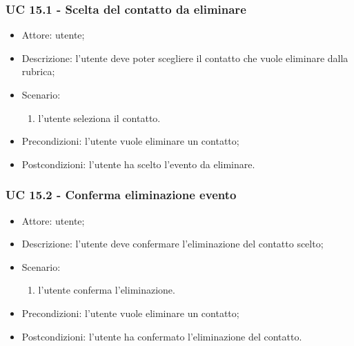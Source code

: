 \subsubsection{UC 15.1 - Scelta del contatto da eliminare} \label{sec: UC 15.1}
\begin{itemize}
    \item Attore: utente;
    \item Descrizione: l'utente deve poter scegliere il contatto che vuole eliminare dalla rubrica;
    \item Scenario:
        \begin{enumerate}
        \item l'utente seleziona il contatto.
        \end{enumerate}
    
    \item Precondizioni: l'utente vuole eliminare un contatto;
    \item Postcondizioni: l'utente ha scelto l'evento da eliminare.
\end{itemize}


\subsubsection{UC 15.2 - Conferma eliminazione evento} \label{sec: UC 15.2}
\begin{itemize}
    \item Attore: utente;
    \item Descrizione: l'utente deve confermare l'eliminazione del contatto scelto;
    \item Scenario:
        \begin{enumerate}
        \item l'utente conferma l'eliminazione.
        \end{enumerate}
    
    \item Precondizioni: l'utente vuole eliminare un contatto;
    \item Postcondizioni: l'utente ha confermato l'eliminazione del contatto.
\end{itemize}


